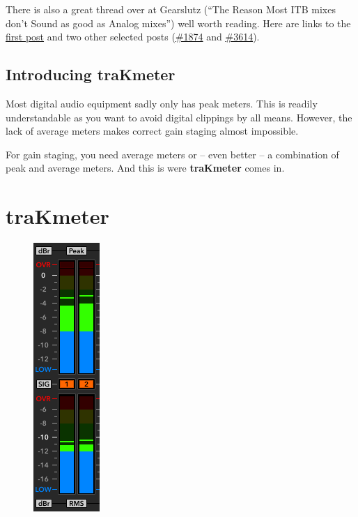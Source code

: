 There is also a great thread over at Gearslutz (``The Reason Most ITB
mixes don’t Sound as good as Analog mixes'') well worth reading.  Here
are links to the
\href{http://www.gearslutz.com/board/5062929-post1.html}{first post}
and two other selected posts
(\href{http://www.gearslutz.com/board/5064831-post1874.html}{\#1874}
and
\href{http://www.gearslutz.com/board/5609740-post3614.html}{\#3614}).

\section{Introducing traKmeter}
\label{sec:introducing_trakmeter}

Most digital audio equipment sadly only has peak meters.  This is
readily understandable as you want to avoid digital clippings by all
means.  However, the lack of average meters makes correct gain staging
almost impossible.

For gain staging, you need average meters or -- even better -- a
combination of peak and average meters.  And this is were
\textbf{traKmeter} comes in.

\chapter{traKmeter}
\label{chap:trakmeter}

\begin{figure}
  \includegraphics[scale=0.625,clip]{include/images/level_meter_complete.png}
\end{figure}

